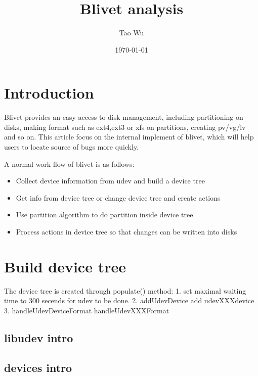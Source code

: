 \documentclass{article}
\begin{document}
\title{\textbf{Blivet analysis}}
\author{Tao Wu}
\date{\today}
\maketitle


\section{Introduction}
Blivet provides an easy access to disk management, including partitioning on
disks, making format such as ext4,ext3 or xfs on partitions, creating pv/vg/lv
and so on.  This article focus on the internal implement of blivet, which will
help users to locate source of bugs more quickly.
  
  A normal work flow of blivet is as follows:
\begin{itemize}
\item Collect device information from udev and build a device tree
\item Get info from device tree or change device tree and create actions
\item Use partition algorithm to do partition inside device tree
\item Process actions in device tree so that changes can be written into disks
\end{itemize}

\section{Build device tree}

The device tree is created through populate() method:
1. set maximal waiting time to 300 secends for udev to be done.
2. addUdevDevice
     add udevXXXdevice
3. handleUdevDeviceFormat
     handleUdevXXXFormat
\subsection{libudev intro}
\subsection{devices intro}
\end{document}
